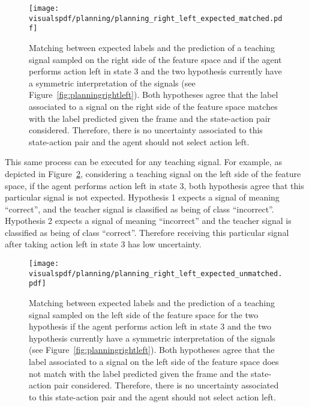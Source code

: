 \begin{figure}[H]
  \centering
  \texttt{[image: \\visualspdf/planning/planning\_right\_left\_expected\_matched.pdf]}
  \caption{Matching between expected labels and the prediction of a teaching signal sampled on the right side of the feature space and if the agent performs action left in state 3 and the two hypothesis currently have a symmetric interpretation of the signals (see Figure~\ref{fig:planningrightleft}). Both hypotheses agree that the label associated to a signal on the right side of the feature space matches with the label predicted given the frame and the state-action pair considered. Therefore, there is no uncertainty associated to this state-action pair and the agent should not select action left.}
  \label{fig:uncertaintymeaningrightleftexpectedleft}
\end{figure}

\visuopti{\newpage}

This same process can be executed for any teaching signal. For example, as depicted in Figure~\ref{fig:uncertaintymeaningrightleftexpectedright}, considering a teaching signal on the left side of the feature space, if the agent performs action left in state 3, both hypothesis agree that this particular signal is not expected. Hypothesis 1 expects a signal of meaning ``correct'', and the teacher signal is classified as being of class ``incorrect''. Hypothesis 2 expects a signal of meaning ``incorrect'' and the teacher signal is classified as being of class ``correct''. Therefore receiving this particular signal after taking action left in state 3 has low uncertainty.

\begin{figure}[H]
  \centering
  \texttt{[image: \\visualspdf/planning/planning\_right\_left\_expected\_unmatched.pdf]}
  \caption{Matching between expected labels and the prediction of a teaching signal sampled on the left side of the feature space for the two hypothesis if the agent performs action left in state 3 and the two hypothesis currently have a symmetric interpretation of the signals (see Figure~\ref{fig:planningrightleft}). Both hypotheses agree that the label associated to a signal on the left side of the feature space does not match with the label predicted given the frame and the state-action pair considered. Therefore, there is no uncertainty associated to this state-action pair and the agent should not select action left.}
  \label{fig:uncertaintymeaningrightleftexpectedright}
\end{figure}

